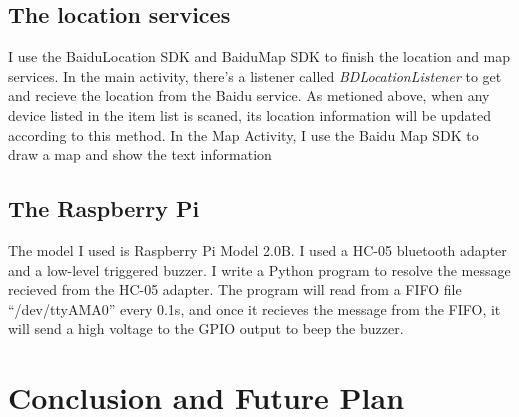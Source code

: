 \documentclass{article}
\begin{document}
\subsection{The location services}
I use the BaiduLocation SDK and BaiduMap SDK to finish the location and map services. In the main activity, there's a listener called \emph{BDLocationListener} to get and recieve the location from the Baidu service. As metioned above, when any device listed in the item list is scaned, its location information will be updated according to this method. In the Map Activity, I use the Baidu Map SDK to draw a map and show the text information
\subsection{The Raspberry Pi}
The model I used is Raspberry Pi Model 2.0B. I used a HC-05 bluetooth adapter and a low-level triggered buzzer. I write a Python program to resolve the message recieved from the HC-05 adapter. The program will read from a FIFO file “/dev/ttyAMA0'' every 0.1s, and once it recieves the message from the FIFO, it will send a high voltage to the GPIO output to beep the buzzer. 
\section{Conclusion and Future Plan}
\end{document}
